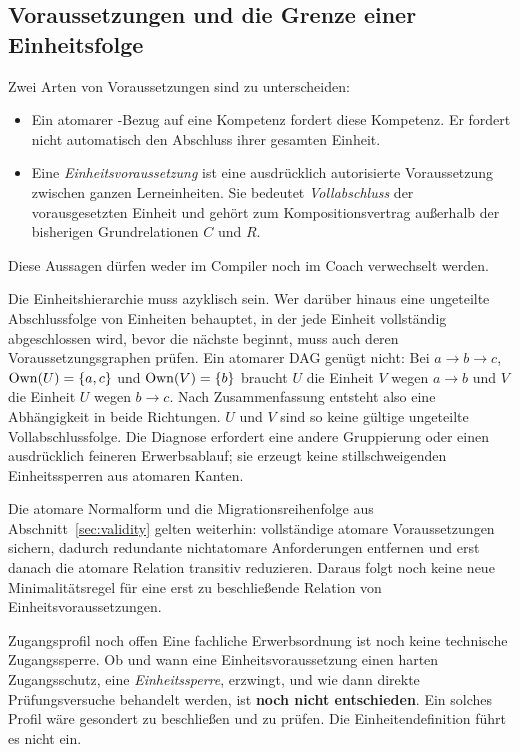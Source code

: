 \subsection{Voraussetzungen und die Grenze einer Einheitsfolge}
Zwei Arten von Voraussetzungen sind zu unterscheiden:
\begin{itemize}
\item Ein atomarer -Bezug auf eine Kompetenz fordert diese
 Kompetenz. Er fordert nicht automatisch den Abschluss ihrer gesamten
 Einheit.
\item Eine \emph{Einheitsvoraussetzung} ist eine ausdrücklich autorisierte
 Voraussetzung zwischen ganzen Lerneinheiten. Sie bedeutet
 \emph{Vollabschluss} der vorausgesetzten Einheit und gehört zum
 Kompositionsvertrag außerhalb der bisherigen Grundrelationen $C$ und $R$.
\end{itemize}
Diese Aussagen dürfen weder im Compiler noch im Coach verwechselt werden.

Die Einheitshierarchie muss azyklisch sein. Wer darüber hinaus eine
ungeteilte Abschlussfolge von Einheiten behauptet, in der jede Einheit
vollständig abgeschlossen wird, bevor die nächste beginnt, muss auch deren
Voraussetzungsgraphen prüfen. Ein atomarer DAG genügt nicht: Bei
$a\to b\to c$, $\operatorname{Own}(U)=\{a,c\}$ und $\operatorname{Own}(V)=\{b\}$ braucht $U$ die
Einheit $V$ wegen $a\to b$ und $V$ die Einheit $U$ wegen $b\to c$. Nach
Zusammenfassung entsteht also eine Abhängigkeit in beide Richtungen. $U$
und $V$ sind so keine gültige ungeteilte Vollabschlussfolge. Die Diagnose
erfordert eine andere Gruppierung oder einen ausdrücklich feineren
Erwerbsablauf; sie erzeugt keine stillschweigenden Einheitssperren aus
atomaren Kanten.

Die atomare Normalform und die Migrationsreihenfolge aus
Abschnitt~\ref{sec:validity} gelten weiterhin: vollständige atomare
Voraussetzungen sichern, dadurch redundante nichtatomare Anforderungen
entfernen und erst danach die atomare Relation transitiv reduzieren.
Daraus folgt noch keine neue Minimalitätsregel für eine erst zu
beschließende Relation von Einheitsvoraussetzungen.

\begin{principle}{Zugangsprofil noch offen}
Eine fachliche Erwerbsordnung ist noch keine technische Zugangssperre.
Ob und wann eine Einheitsvoraussetzung einen harten Zugangsschutz, eine
\emph{Einheitssperre}, erzwingt, und wie dann direkte Prüfungsversuche
behandelt werden, ist \textbf{noch nicht entschieden}. Ein solches Profil
wäre gesondert zu beschließen und zu prüfen. Die Einheitendefinition führt
es nicht ein.
\end{principle}

